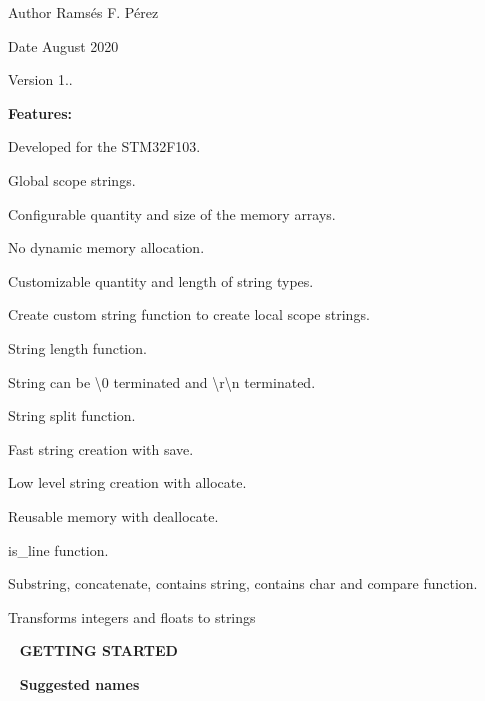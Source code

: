 \begin{DoxyAuthor}{Author}
Ramsés F. Pérez 
\end{DoxyAuthor}
\begin{DoxyDate}{Date}
August 2020 
\end{DoxyDate}
\begin{DoxyVersion}{Version}
1..
\end{DoxyVersion}
{\bfseries{Features\+:}}


\begin{DoxyItemize}
\item Developed for the S\+T\+M32\+F103.
\item Global scope strings.
\item Configurable quantity and size of the memory arrays.
\item No dynamic memory allocation.
\item Customizable quantity and length of string types.
\item Create custom string function to create local scope strings.
\item String length function.
\item String can be \textbackslash{}0 terminated and \textbackslash{}r\textbackslash{}n terminated.
\item String split function.
\item Fast string creation with save.
\item Low level string creation with allocate.
\item Reusable memory with deallocate.
\item is\+\_\+line function.
\item Substring, concatenate, contains string, contains char and compare function.
\item Transforms integers and floats to strings
\end{DoxyItemize}

~\newline
{\bfseries{G\+E\+T\+T\+I\+NG S\+T\+A\+R\+T\+ED}}

~\newline
{\bfseries{Suggested names}} ~\newline
 
\begin{DoxyCode}{0}
\end{DoxyCode}


